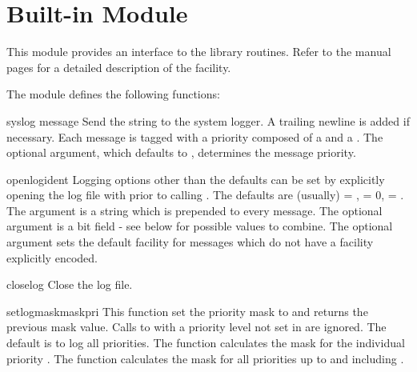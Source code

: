 \section{Built-in Module }
\label{module-syslog}

This module provides an interface to the \UNIX{}  library
routines.  Refer to the \UNIX{} manual pages for a detailed description
of the  facility.

The module defines the following functions:

\renewcommand{\indexsubitem}{(in module syslog)}

\begin{funcdesc}{syslog}{ message}
Send the string  to the system logger.
A trailing newline is added if necessary.
Each message is tagged with a priority composed of a  and
a .
The optional  argument, which defaults to
, determines the message priority.
\end{funcdesc}

\begin{funcdesc}{openlog}{ident}
Logging options other than the defaults can be set by explicitly opening
the log file with  prior to calling .
The defaults are (usually)  = ,  = 0,
 = .
The  argument is a string which is prepended to every message.
The optional  argument is a bit field - see below for possible
values to combine.
The optional  argument sets the default facility for messages
which do not have a facility explicitly encoded.
\end{funcdesc}

\begin{funcdesc}{closelog}{}
Close the log file.
\end{funcdesc}

\begin{funcdesc}{setlogmask}{maskpri}
This function set the priority mask to  and returns the
previous mask value.
Calls to  with a priority level not set in 
are ignored.
The default is to log all priorities.
The function  calculates the mask for the
individual priority .
The function  calculates the mask for all priorities
up to and including .
\end{funcdesc}

